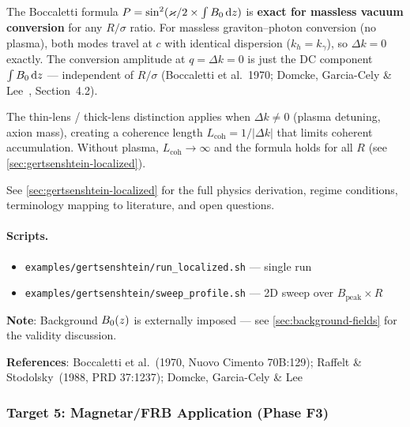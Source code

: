 The Boccaletti formula $P = \sin^2(\varkappa/2 \times \int B_0\,\mathrm{d}z)$ is \textbf{exact for massless vacuum conversion} for any $R/\sigma$ ratio. For massless graviton--photon conversion (no plasma), both modes travel at $c$ with identical dispersion ($k_h = k_\gamma$), so $\Delta k = 0$ exactly. The conversion amplitude at $q = \Delta k = 0$ is just the DC component $\int B_0\,\mathrm{d}z$ --- independent of $R/\sigma$ (Boccaletti et al.~1970; Domcke, Garcia-Cely \& Lee~\cite{domcke2025scattering}, Section~4.2).

The thin-lens / thick-lens distinction applies when $\Delta k \neq 0$ (plasma detuning, axion mass), creating a coherence length $L_\mathrm{coh} = 1/|\Delta k|$ that limits coherent accumulation. Without plasma, $L_\mathrm{coh} \to \infty$ and the formula holds for all $R$ (see \cref{sec:gertsenshtein-localized}).

See \cref{sec:gertsenshtein-localized} for the full physics derivation, regime conditions, terminology mapping to literature, and open questions.

\paragraph{Scripts.}
\begin{itemize}
  \item \texttt{examples/gertsenshtein/run\_localized.sh} --- single run
  \item \texttt{examples/gertsenshtein/sweep\_profile.sh} --- 2D sweep over $B_\mathrm{peak} \times R$
\end{itemize}

\textbf{Note}: Background $B_0(z)$ is externally imposed --- see \cref{sec:background-fields} for the validity discussion.

\textbf{References}: Boccaletti et al.~(1970, Nuovo Cimento 70B:129); Raffelt \& Stodolsky~(1988, PRD 37:1237); Domcke, Garcia-Cely \& Lee~\cite{domcke2025scattering}

\subsubsection{Target 5: Magnetar/FRB Application (Phase F3)}
\label{subsec:target5}

